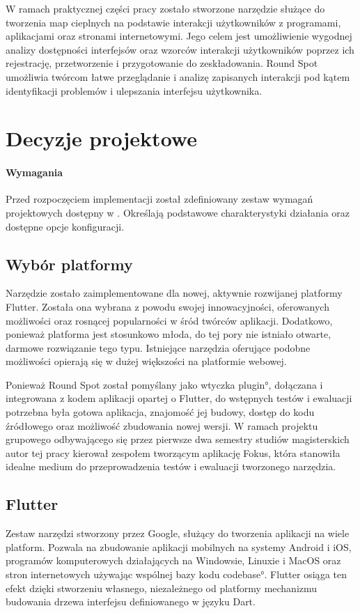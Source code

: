 W ramach praktycznej części pracy zostało stworzone narzędzie służące do tworzenia map cieplnych na podstawie interakcji użytkowników z programami, aplikacjami oraz stronami internetowymi. Jego celem jest umożliwienie wygodnej analizy dostępności interfejsów oraz wzorców interakcji użytkowników poprzez ich rejestrację, przetworzenie i przygotowanie do zeskładowania. Round Spot umożliwia twórcom łatwe przeglądanie i analizę zapisanych interakcji pod kątem identyfikacji problemów i ulepszania interfejsu użytkownika.

\section{Decyzje projektowe}

\paragraph{Wymagania} Przed rozpoczęciem implementacji został zdefiniowany zestaw wymagań projektowych dostępny w . Określają podstawowe charakterystyki działania oraz dostępne opcje konfiguracji.

\subsection{Wybór platformy}
Narzędzie zostało zaimplementowane dla nowej, aktywnie rozwijanej platformy Flutter. Została ona wybrana z powodu swojej innowacyjności, oferowanych możliwości oraz rosnącej popularności w śród twórców aplikacji. Dodatkowo, ponieważ platforma jest stosunkowo młoda, do tej pory nie istniało otwarte, darmowe rozwiązanie tego typu. Istniejące narzędzia oferujące podobne możliwości opierają się w dużej większości na platformie webowej.

Ponieważ Round Spot został pomyślany jako wtyczka \ang{plugin}, dołączana i integrowana z kodem aplikacji opartej o Flutter, do wstępnych testów i ewaluacji potrzebna była gotowa aplikacja, znajomość jej budowy, dostęp do kodu źródłowego oraz możliwość zbudowania nowej wersji. W ramach projektu grupowego odbywającego się przez pierwsze dwa semestry studiów magisterskich autor tej pracy kierował zespołem tworzącym aplikację Fokus, która stanowiła idealne medium do przeprowadzenia testów i ewaluacji tworzonego narzędzia.

\subsection{Flutter}
Zestaw narzędzi stworzony przez Google, służący do tworzenia aplikacji na wiele platform. Pozwala na zbudowanie aplikacji mobilnych na systemy Android i iOS, programów komputerowych działających na Windowsie, Linuxie i MacOS oraz stron internetowych używając wspólnej bazy kodu \ang{codebase}. Flutter osiąga ten efekt dzięki stworzeniu własnego, niezależnego od platformy mechanizmu budowania drzewa interfejsu definiowanego w języku Dart. 


